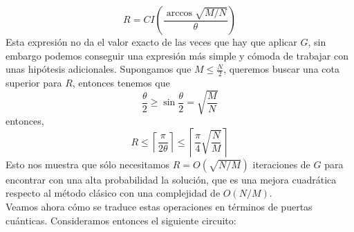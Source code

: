\documentclass[a4paper]{article}
\numberwithin{equation}{section}
\begin{document}
\begin{equation}
R = CI\left( \frac{\arccos \sqrt{M/N}}{\theta} \right)
\end{equation}
Esta expresión no da el valor exacto de las veces que hay que aplicar $G$, sin embargo podemos conseguir una expresión más simple y cómoda de trabajar con unas hipótesis adicionales. Supongamos que $M \leq \frac{N}{2}$, queremos buscar una cota superior para $R$, entonces tenemos que
\begin{equation}
\frac{\theta}{2} \geq \sin \frac{\theta}{2} = \sqrt{\frac{M}{N}}
\end{equation}
entonces,
\begin{equation}
R \leq \left\lceil \frac{\pi}{2\theta} \right\rceil \leq \left\lceil \frac{\pi}{4} \sqrt{\frac{N}{M}} \right\rceil
\end{equation}
Esto nos muestra que sólo necesitamos $R = O(\sqrt{N/M})$ iteraciones de $G$ para encontrar con una alta probabilidad la solución, que es una mejora cuadrática respecto al método clásico con una complejidad de $O(N/M)$.\\

Veamos ahora cómo se traduce estas operaciones en términos de puertas cuánticas. Consideramos entonces el siguiente circuito:
\end{document}
